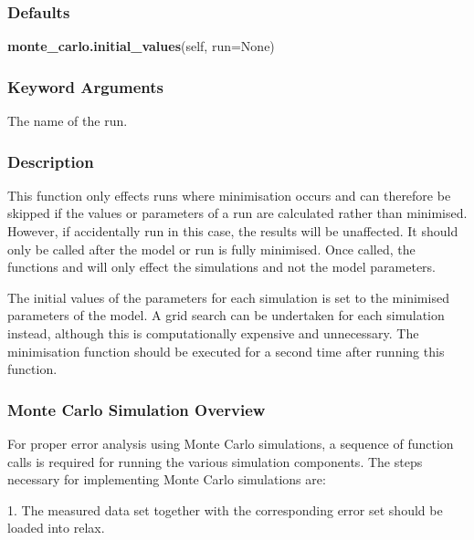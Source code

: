   
 \subsubsection{Defaults} 

 \textsf{\textbf{monte\_carlo.initial\_values}(self, run=None)} 

  
 \subsubsection{Keyword Arguments} 

   The name of the run.  

  

  
 \subsubsection{Description} 

 This function only effects runs where minimisation occurs and can therefore be skipped if the values or parameters of a run are calculated rather than minimised.  However, if accidentally run in this case, the results will be unaffected.  It should only be called after the model or run is fully minimised.  Once called, the functions  and  will only effect the simulations and not the model parameters. 
  

 The initial values of the parameters for each simulation is set to the minimised parameters of the model.  A grid search can be undertaken for each simulation instead, although this is computationally expensive and unnecessary.  The minimisation function should be executed for a second time after running this function. 
  

  
 \subsubsection{Monte Carlo Simulation Overview} 

 For proper error analysis using Monte Carlo simulations, a sequence of function calls is required for running the various simulation components.  The steps necessary for implementing Monte Carlo simulations are: 
  

 1.  The measured data set together with the corresponding error set should be loaded into relax. 
  

